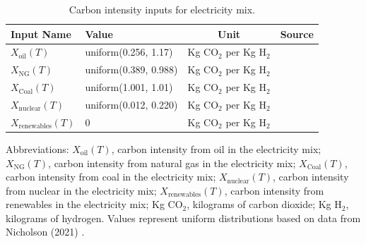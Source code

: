 \documentclass{article}
\begin{document}
\begin{table}[H]
  \centering
  \caption{Carbon intensity inputs for electricity mix.}
  \label{table:carbon_intensity_inputs}
  \begin{threeparttable}
    \begin{tabular}{@{}lp{6cm}cp{2cm}@{}}
      \toprule
      \textbf{Input Name} & \textbf{Value} & \textbf{Unit} & \textbf{Source} \\ \midrule
      $X_{\text{oil}}(T)$ & uniform(0.256, 1.17) & Kg CO$_2$ per Kg H$_2$ & \cite{Nicholson2021} \\
      $X_{\text{NG}}(T)$ & uniform(0.389, 0.988) & Kg CO$_2$ per Kg H$_2$ & \cite{Nicholson2021} \\
      $X_{\text{Coal}}(T)$ & uniform(1.001, 1.01) & Kg CO$_2$ per Kg H$_2$ & \cite{Nicholson2021} \\
      $X_{\text{nuclear}}(T)$ & uniform(0.012, 0.220) & Kg CO$_2$ per Kg H$_2$ & \cite{Nicholson2021} \\
      $X_{\text{renewables}}(T)$ & 0 & Kg CO$_2$ per Kg H$_2$ & \cite{Nicholson2021} \\ \bottomrule
    \end{tabular}
    \begin{tablenotes}
  \small
  \item Abbreviations: $X_{\text{oil}}(T)$, carbon intensity from oil in the electricity mix; $X_{\text{NG}}(T)$, carbon intensity from natural gas in the electricity mix; $X_{\text{Coal}}(T)$, carbon intensity from coal in the electricity mix; $X_{\text{nuclear}}(T)$, carbon intensity from nuclear in the electricity mix; $X_{\text{renewables}}(T)$, carbon intensity from renewables in the electricity mix; Kg CO$_2$, kilograms of carbon dioxide; Kg H$_2$, kilograms of hydrogen. Values represent uniform distributions based on data from Nicholson (2021) \cite{Nicholson2021}.
\end{tablenotes}

  \end{threeparttable}
\end{table}
\end{document}
